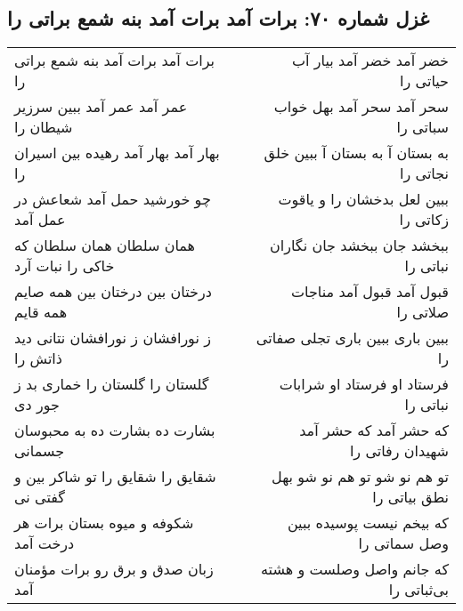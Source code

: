 \begin{center}
\section*{غزل شماره ۷۰: برات آمد برات آمد بنه شمع براتی را}
\label{sec:0070}
\begin{longtable}{l p{0.5cm} r}
برات آمد برات آمد بنه شمع براتی را
&&
خضر آمد خضر آمد بیار آب حیاتی را
\\
عمر آمد عمر آمد ببین سرزیر شیطان را
&&
سحر آمد سحر آمد بهل خواب سباتی را
\\
بهار آمد بهار آمد رهیده بین اسیران را
&&
به بستان آ به بستان آ ببین خلق نجاتی را
\\
چو خورشید حمل آمد شعاعش در عمل آمد
&&
ببین لعل بدخشان را و یاقوت زکاتی را
\\
همان سلطان همان سلطان که خاکی را نبات آرد
&&
ببخشد جان ببخشد جان نگاران نباتی را
\\
درختان بین درختان بین همه صایم همه قایم
&&
قبول آمد قبول آمد مناجات صلاتی را
\\
ز نورافشان ز نورافشان نتانی دید ذاتش را
&&
ببین باری ببین باری تجلی صفاتی را
\\
گلستان را گلستان را خماری بد ز جور دی
&&
فرستاد او فرستاد او شرابات نباتی را
\\
بشارت ده بشارت ده به محبوسان جسمانی
&&
که حشر آمد که حشر آمد شهیدان رفاتی را
\\
شقایق را شقایق را تو شاکر بین و گفتی نی
&&
تو هم نو شو تو هم نو شو بهل نطق بیاتی را
\\
شکوفه و میوه بستان برات هر درخت آمد
&&
که بیخم نیست پوسیده ببین وصل سماتی را
\\
زبان صدق و برق رو برات مؤمنان آمد
&&
که جانم واصل وصلست و هشته بی‌ثباتی را
\\
\end{longtable}
\end{center}
